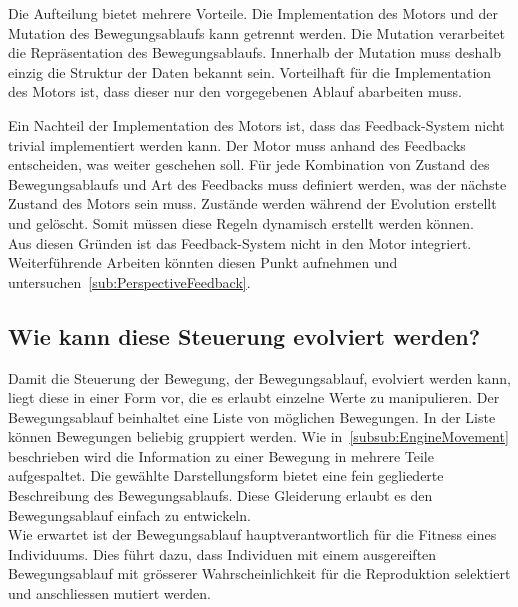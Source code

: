       \smallskip

      Die Aufteilung bietet mehrere Vorteile.
      Die Implementation des Motors und der Mutation des Bewegungsablaufs kann getrennt werden.
      Die Mutation verarbeitet die Repräsentation des Bewegungsablaufs.
      Innerhalb der Mutation muss deshalb einzig die Struktur der Daten bekannt sein.
      Vorteilhaft für die Implementation des Motors ist, dass dieser nur den vorgegebenen Ablauf abarbeiten muss.

      \smallskip

      Ein Nachteil der Implementation des Motors ist, dass das Feedback-System nicht trivial implementiert werden kann.
      Der Motor muss anhand des Feedbacks entscheiden, was weiter geschehen soll.
      Für jede Kombination von Zustand des Bewegungsablaufs und Art des Feedbacks muss definiert werden,
      was der nächste Zustand des Motors sein muss.
      Zustände werden während der Evolution erstellt und gelöscht.
      Somit müssen diese Regeln dynamisch erstellt werden können.
      \\
      Aus diesen Gründen ist das Feedback-System nicht in den Motor integriert.
      Weiterführende Arbeiten könnten diesen Punkt aufnehmen und untersuchen~\vref{sub:PerspectiveFeedback}.

    \subsection{Wie kann diese Steuerung evolviert werden?\label{sub:wieStEv}}

      Damit die Steuerung der Bewegung, der Bewegungsablauf, evolviert werden kann, liegt diese in einer Form vor,
      die es erlaubt einzelne Werte zu manipulieren.
      Der Bewegungsablauf beinhaltet eine Liste von möglichen Bewegungen.
      In der Liste können Bewegungen beliebig gruppiert werden.
      Wie in~\vref{subsub:EngineMovement} beschrieben
      wird die Information zu einer Bewegung in mehrere Teile aufgespaltet.
      Die gewählte Darstellungsform bietet eine fein gegliederte Beschreibung des Bewegungsablaufs.
      Diese Gleiderung erlaubt es den Bewegungsablauf einfach zu entwickeln.
      \\
      Wie erwartet ist der Bewegungsablauf hauptverantwortlich für die Fitness eines Individuums.
      Dies führt dazu, dass Individuen mit einem ausgereiften Bewegungsablauf mit grösserer Wahrscheinlichkeit
      für die Reproduktion selektiert und anschliessen mutiert werden.

